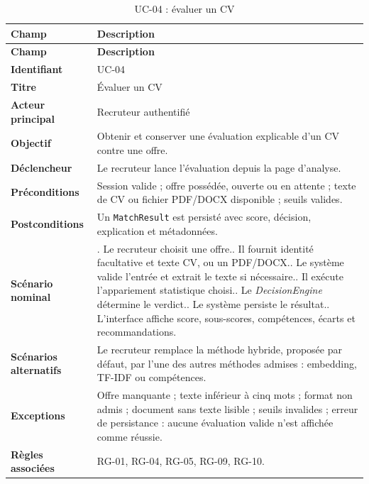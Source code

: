 {\small
\begin{longtable}{|>{\raggedright\arraybackslash\bfseries}p{}|>{\raggedright\arraybackslash}p{}|}
\caption{UC-04 : évaluer un CV}\label{tab:uc04}\\
\hline
\textbf{Champ} & \textbf{Description}\\
\hline
\endfirsthead
\hline
\textbf{Champ} & \textbf{Description}\\
\hline
\endhead
Identifiant & UC-04\\
\hline
Titre & Évaluer un CV\\
\hline
Acteur principal & Recruteur authentifié\\
\hline
Objectif & Obtenir et conserver une évaluation explicable d'un CV contre une offre.\\
\hline
Déclencheur & Le recruteur lance l'évaluation depuis la page d'analyse.\\
\hline
Préconditions & Session valide ; offre possédée, ouverte ou en attente ; texte de CV ou fichier PDF/DOCX disponible ; seuils valides.\\
\hline
Postconditions & Un \texttt{MatchResult} est persisté avec score, décision, explication et métadonnées.\\
\hline
Scénario nominal & 1. Le recruteur choisit une offre.\newline 2. Il fournit identité facultative et texte CV, ou un PDF/DOCX.\newline 3. Le système valide l'entrée et extrait le texte si nécessaire.\newline 4. Il exécute l'appariement statistique choisi.\newline 5. Le \textit{DecisionEngine} détermine le verdict.\newline 6. Le système persiste le résultat.\newline 7. L'interface affiche score, sous-scores, compétences, écarts et recommandations.\\
\hline
Scénarios alternatifs & Le recruteur remplace la méthode hybride, proposée par défaut, par l'une des autres méthodes admises : embedding, TF-IDF ou compétences.\\
\hline
Exceptions & Offre manquante ; texte inférieur à cinq mots ; format non admis ; document sans texte lisible ; seuils invalides ; erreur de persistance : aucune évaluation valide n'est affichée comme réussie.\\
\hline
Règles associées & RG-01, RG-04, RG-05, RG-09, RG-10.\\
\hline
\end{longtable}}

